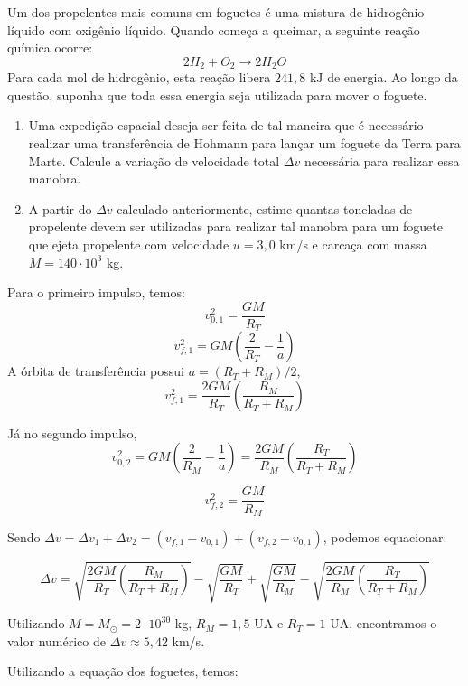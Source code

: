 \documentclass[11pt]{article}
\begin{document}
\begin{pproblem} Um dos propelentes mais comuns em foguetes é uma mistura de hidrogênio líquido com oxigênio líquido. Quando começa a queimar, a seguinte reação química ocorre:
    \[
    2H_2 + O_2 \rightarrow 2H_2O
    \] 
    Para cada mol de hidrogênio, esta reação libera \(241,8 \text{ kJ}\) de energia. Ao longo da questão, suponha que toda essa energia seja utilizada para mover o foguete.
    \begin{enumerate}[label=\textbf{\alph*)}]
        \item Uma expedição espacial deseja ser feita de tal maneira que é necessário realizar uma transferência de Hohmann para lançar um foguete da Terra para Marte. Calcule a variação de velocidade total \(\Delta v\) necessária para realizar essa manobra.
        \item A partir do \(\Delta v\) calculado anteriormente, estime quantas toneladas de propelente devem ser utilizadas para realizar tal manobra para um foguete que ejeta propelente com velocidade \(u = 3,0\) km/s e carcaça com massa \(M = 140\cdot10^3\) kg.
    \end{enumerate}
    \begin{pssolution*}{}{}
        \begin{alternativas}
            \item Para o primeiro impulso, temos:
            \[v_{0,1}^2=\frac{GM}{R_T}\]
            \[v_{f,1}^2 = GM\left(\frac{2}{R_T}-\frac{1}{a}\right)\]
            A órbita de transferência possui \(a=(R_T+R_M)/2\),
            \[v_{f,1}^2 = \frac{2GM}{R_T}\left(\frac{R_M}{R_T+R_M}\right)\]

            Já no segundo impulso,
            \[v_{0,2}^2 = GM\left(\frac{2}{R_M}-\frac{1}{a}\right) = \frac{2GM}{R_M}\left(\frac{R_T}{R_T+R_M}\right)\]

            \[v_{f,2}^2 = \frac{GM}{R_M}\]

            Sendo \(\Delta v = \Delta v_1 + \Delta v_2 = (v_{f,1}-v_{0,1})+(v_{f,2}-v_{0,1})\), podemos equacionar:

            \[\boxed{\Delta v = \sqrt{\frac{2GM}{R_T}\left(\frac{R_M}{R_T+R_M}\right)}-\sqrt{\frac{GM}{R_T}} + \sqrt{\frac{GM}{R_M}} - \sqrt{\frac{2GM}{R_M}\left(\frac{R_T}{R_T+R_M}\right)}}\]
            
            Utilizando \(M = M_\odot = 2\cdot10^{30}\) kg, \(R_M = 1,5\) UA e \(R_T = 1\) UA, encontramos o valor numérico de \(\Delta v \approx 5,42 \) km/s.

            \item Utilizando a equação dos foguetes, temos:
            

\end{alternativas}
\end{pssolution*}
\end{pproblem}
\end{document}
